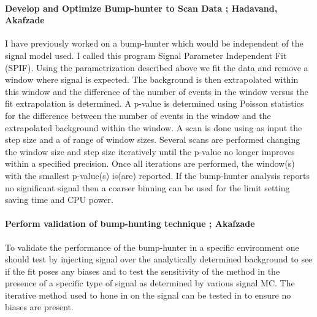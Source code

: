 \paragraph{Develop and Optimize Bump-hunter to Scan Data ;  Hadavand, Akafzade} %
I have previously worked on a bump-hunter which would be independent of the signal model used.  I called this program Signal Parameter Independent Fit (SPIF).  Using the parametrization described above we fit the data and remove a window where signal is expected.
The background is then extrapolated within this window and the difference of the number of events in the window versus the fit extrapolation is determined.  A p-value is determined using Poisson statistics for the difference between the number of events in the window and the extrapolated background within the window.
A scan is done using as input the step size and a of range of window sizes.  Several scans are performed changing the window size and step size iteratively until the p-value no longer improves within a specified precision.  
Once all iterations are performed, the window(s) with the smallest p-value(s) is(are) reported.  
If the bump-hunter analysis reports no significant signal then a coarser binning can be used for the limit setting saving time and CPU power.



\paragraph{Perform validation of bump-hunting technique ;  Akafzade} %
To validate the performance of the bump-hunter in a specific environment one should test by injecting signal over the analytically determined background to see if the fit poses any biases and to test the sensitivity of the method in the presence of
a specific type of signal as determined by various signal MC.  The iterative method used to hone in on the signal can be tested in to ensure no biases are present.



